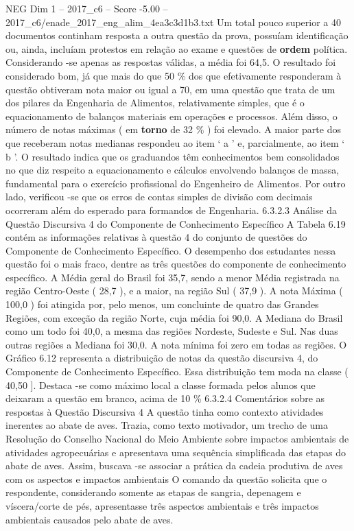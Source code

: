 \begin{textsample}{NEG Dim 1 – 2017\_c6 – Score -5.00 – 2017\_c6/enade\_2017\_eng\_alim\_4ea3c3d1b3.txt}
Um total pouco superior a 40 documentos continham resposta a outra questão da prova, possuíam identificação ou, ainda, incluíam protestos em relação ao exame e questões de \textbf{ordem} política.
Considerando -se apenas as respostas válidas, a média foi 64,5.
O resultado foi considerado bom, já que mais do que 50 \% dos que efetivamente responderam à questão obtiveram nota maior ou igual a 70, em uma questão que trata de um dos pilares da Engenharia de Alimentos, relativamente simples, que é o equacionamento de balanços materiais em operações e processos.
Além disso, o número de notas máximas ( em \textbf{torno} de 32 \% ) foi elevado.
A maior parte dos que receberam notas medianas respondeu ao item ‘ a ’ e, parcialmente, ao item ‘ b ’.
O resultado indica que os graduandos têm conhecimentos bem consolidados no que diz respeito a equacionamento e cálculos envolvendo balanços de massa, fundamental para o exercício profissional do Engenheiro de Alimentos.
Por outro lado, verificou -se que os erros de contas simples de divisão com decimais ocorreram além do esperado para formandos de Engenharia. 6.3.2.3 Análise da Questão Discursiva 4 do Componente de Conhecimento Específico A Tabela 6.19 contém as informações relativas à questão 4 do conjunto de questões do Componente de Conhecimento Específico.
O desempenho dos estudantes nessa questão foi o mais fraco, dentre as três questões do componente de conhecimento específico.
A Média geral do Brasil foi 35,7, sendo a menor Média registrada na região Centro-Oeste ( 28,7 ), e a maior, na região Sul ( 37,9 ).
A nota Máxima ( 100,0 ) foi atingida por, pelo menos, um concluinte de quatro das Grandes Regiões, com exceção da região Norte, cuja média foi 90,0.
A Mediana do Brasil como um todo foi 40,0, a mesma das regiões Nordeste, Sudeste e Sul.
Nas duas outras regiões a Mediana foi 30,0.
A nota mínima foi zero em todas as regiões.
O Gráfico 6.12 representa a distribuição de notas da questão discursiva 4, do Componente de Conhecimento Específico.
Essa distribuição tem moda na classe ( 40,50 ].
Destaca -se como máximo local a classe formada pelos alunos que deixaram a questão em branco, acima de 10 \% 6.3.2.4 Comentários sobre as respostas à Questão Discursiva 4 A questão tinha como contexto atividades inerentes ao abate de aves.
Trazia, como texto motivador, um trecho de uma Resolução do Conselho Nacional do Meio Ambiente sobre impactos ambientais de atividades agropecuárias e apresentava uma sequência simplificada das etapas do abate de aves.
Assim, buscava -se associar a prática da cadeia produtiva de aves com os aspectos e impactos ambientais O comando da questão solicita que o respondente, considerando somente as etapas de sangria, depenagem e víscera/corte de pés, apresentasse três aspectos ambientais e três impactos ambientais causados pelo abate de aves.

\end{textsample}
